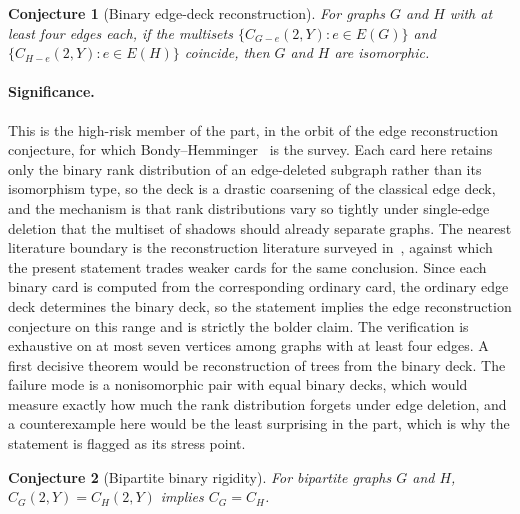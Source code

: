 \documentclass[11pt]{article}
\newtheorem{conjecture}{Conjecture}
\theoremstyle{definition}
\begin{document}
\begin{conjecture}[Binary edge-deck reconstruction]\label{u5}
For graphs $G$ and $H$ with at least four edges each, if the multisets $\{C_{G-e}(2,Y):e\in E(G)\}$ and $\{C_{H-e}(2,Y):e\in E(H)\}$ coincide, then $G$ and $H$ are isomorphic.
\end{conjecture}

\paragraph{Significance.}
This is the high-risk member of the part, in the orbit of the edge reconstruction conjecture, for which Bondy--Hemminger~\cite{BH77} is the survey.  Each card here retains only the binary rank distribution of an edge-deleted subgraph rather than its isomorphism type, so the deck is a drastic coarsening of the classical edge deck, and the mechanism is that rank distributions vary so tightly under single-edge deletion that the multiset of shadows should already separate graphs.  The nearest literature boundary is the reconstruction literature surveyed in~\cite{BH77}, against which the present statement trades weaker cards for the same conclusion.  Since each binary card is computed from the corresponding ordinary card, the ordinary edge deck determines the binary deck, so the statement implies the edge reconstruction conjecture on this range and is strictly the bolder claim.  The verification is exhaustive on at most seven vertices among graphs with at least four edges.  A first decisive theorem would be reconstruction of trees from the binary deck.  The failure mode is a nonisomorphic pair with equal binary decks, which would measure exactly how much the rank distribution forgets under edge deletion, and a counterexample here would be the least surprising in the part, which is why the statement is flagged as its stress point.

\begin{conjecture}[Bipartite binary rigidity]\label{u6}
For bipartite graphs $G$ and $H$, $C_G(2,Y)=C_H(2,Y)$ implies $C_G=C_H$.
\end{conjecture}
\end{document}
